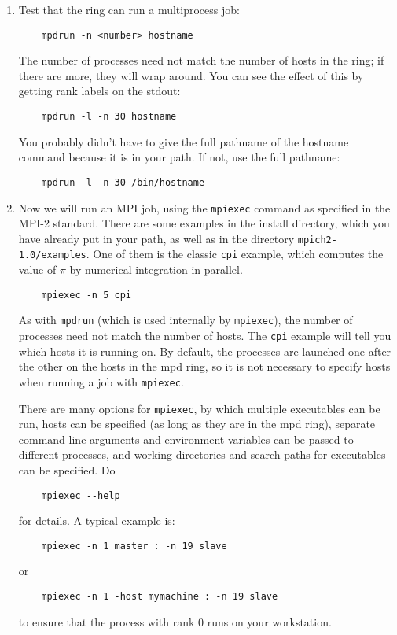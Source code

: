 \documentclass[dvipdfm,11pt]{article}
\begin{document}
\begin{enumerate}
\item
Test that the ring can run a multiprocess job:
\begin{verbatim}
    mpdrun -n <number> hostname
\end{verbatim}
The number of processes need not match the number of hosts in the
ring;  if there are more, they will wrap around.  You can see the
effect of this by getting rank labels on the stdout:
\begin{verbatim}
    mpdrun -l -n 30 hostname
\end{verbatim}
You probably didn't have to give the full pathname of the hostname
command because it is in your path.  If not, use the full pathname:
\begin{verbatim}
    mpdrun -l -n 30 /bin/hostname
\end{verbatim}

\item
Now we will run an MPI job, using the \texttt{mpiexec} command as specified
in the MPI-2 standard.  There are some examples in the install
directory, which you have already put in your path, as well as in
the directory \texttt{mpich2-1.0/examples}.  One of them is the classic \texttt{cpi}
example, which computes the value of $\pi$ by numerical integration in
parallel.   
\begin{verbatim}
    mpiexec -n 5 cpi
\end{verbatim}
As with \texttt{mpdrun} (which is used internally by \texttt{mpiexec}), the number of
processes need not match the number of hosts.  The \texttt{cpi} example will
tell you which hosts it is running on.  By default, the processes
are launched one after the other on the hosts in the mpd ring, so it
is not necessary to specify hosts when running a job with \texttt{mpiexec}.

There are many options for \texttt{mpiexec}, by which multiple executables
can be run, hosts can be specified (as long as they are in the mpd
ring), separate command-line arguments and environment variables can
be passed to different processes, and working directories and search
paths for executables can be specified.  Do
\begin{verbatim}
    mpiexec --help
\end{verbatim}
for details. A typical example is:
\begin{verbatim}
    mpiexec -n 1 master : -n 19 slave
\end{verbatim}
or
\begin{verbatim}
    mpiexec -n 1 -host mymachine : -n 19 slave
\end{verbatim}
to ensure that the process with rank 0 runs on your workstation.


\end{enumerate}
\end{document}
